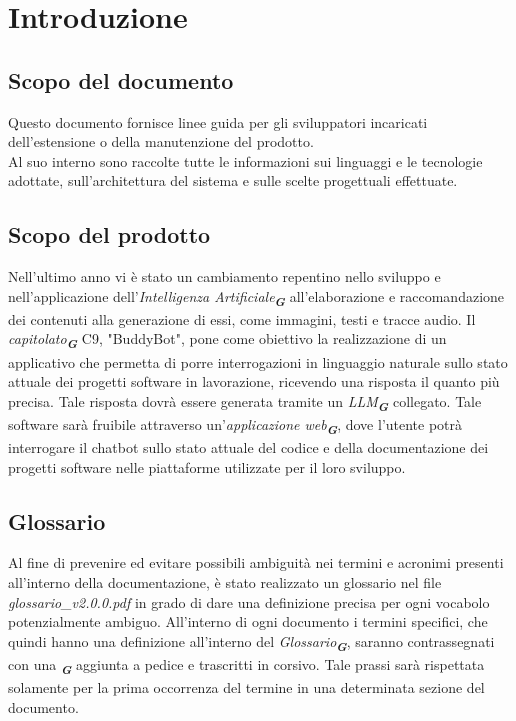 

\section{Introduzione}
\label{sec:introduzione}

\subsection{Scopo del documento}
Questo documento fornisce linee guida per gli sviluppatori incaricati dell'estensione o della manutenzione del prodotto.\\
Al suo interno sono raccolte tutte le informazioni sui linguaggi e le tecnologie adottate, sull’architettura del sistema e sulle
scelte progettuali effettuate.

\subsection{Scopo del prodotto}
Nell’ultimo anno vi è stato un cambiamento repentino nello sviluppo e nell’applicazione
dell’\emph{Intelligenza Artificiale}\textsubscript{\textbf{\textit{G}}} all’elaborazione e raccomandazione dei contenuti alla
generazione
di essi, come immagini, testi e tracce audio.
Il \emph{capitolato}\textsubscript{\textbf{\textit{G}}} C9, "BuddyBot", pone come obiettivo la realizzazione di un applicativo che
permetta di porre interrogazioni in
linguaggio naturale sullo stato attuale dei progetti software in lavorazione, ricevendo una risposta il quanto più precisa. Tale
risposta dovrà essere generata tramite un \emph{LLM}\textsubscript{\textbf{\textit{G}}} collegato. Tale software sarà fruibile
attraverso un'\emph{applicazione web}\textsubscript{\textbf{\textit{G}}}, dove l'utente potrà interrogare il chatbot sullo stato
attuale del codice e della documentazione dei progetti software nelle piattaforme utilizzate per il loro sviluppo.

\subsection{Glossario}
Al fine di prevenire ed evitare possibili ambiguità nei termini e acronimi presenti all’interno della documentazione, è stato
realizzato un glossario nel file \emph{glossario\_v2.0.0.pdf} in grado di dare una definizione precisa per ogni vocabolo potenzialmente
ambiguo. All’interno di ogni documento i termini specifici, che quindi hanno una definizione all’interno del 
\emph{Glossario}\textsubscript{\textbf{\textit{G}}}, saranno
contrassegnati con una \textsubscript{\textbf{\textit{G}}} aggiunta a pedice e trascritti in corsivo. Tale prassi sarà rispettata
solamente per la prima occorrenza del termine in una determinata sezione del documento.

